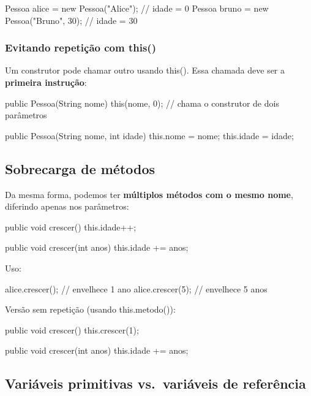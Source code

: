 \documentclass[11pt,a4paper]{article}
\renewcommand{\texttt}[1]{{\color{javaCodeInline}\small\ttfamily #1}}
\begin{document}
\begin{javacode}
Pessoa alice = new Pessoa("Alice");       // idade = 0
Pessoa bruno = new Pessoa("Bruno", 30);  // idade = 30
\end{javacode}

\subsubsection{Evitando repetição com \texttt{this()}}

Um construtor pode chamar outro usando \texttt{this()}. Essa chamada deve ser a \textbf{primeira instrução}:

\begin{javacode}
public Pessoa(String nome) {
    this(nome, 0); // chama o construtor de dois parâmetros
}

public Pessoa(String nome, int idade) {
    this.nome = nome;
    this.idade = idade;
}
\end{javacode}

\subsection{Sobrecarga de métodos}

Da mesma forma, podemos ter \textbf{múltiplos métodos com o mesmo nome}, diferindo apenas nos parâmetros:

\begin{javacode}
public void crescer() {
    this.idade++;
}

public void crescer(int anos) {
    this.idade += anos;
}
\end{javacode}

Uso:

\begin{javacode}
alice.crescer();     // envelhece 1 ano
alice.crescer(5);    // envelhece 5 anos
\end{javacode}

Versão sem repetição (usando \texttt{this.metodo()}):

\begin{javacode}
public void crescer() {
    this.crescer(1);
}

public void crescer(int anos) {
    this.idade += anos;
}
\end{javacode}

\subsection{Variáveis primitivas vs.\ variáveis de referência}
\end{document}
